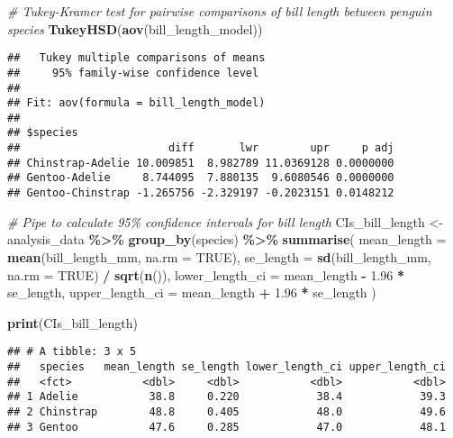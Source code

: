 \documentclass[
]{article}
\newenvironment{Shaded}{\begin{snugshade}}{\end{snugshade}}
\newcommand{\AttributeTok}[1]{\textcolor[rgb]{0.13,0.29,0.53}{#1}}
\newcommand{\CommentTok}[1]{\textcolor[rgb]{0.56,0.35,0.01}{\textit{#1}}}
\newcommand{\ConstantTok}[1]{\textcolor[rgb]{0.56,0.35,0.01}{#1}}
\newcommand{\FloatTok}[1]{\textcolor[rgb]{0.00,0.00,0.81}{#1}}
\newcommand{\FunctionTok}[1]{\textcolor[rgb]{0.13,0.29,0.53}{\textbf{#1}}}
\newcommand{\NormalTok}[1]{#1}
\newcommand{\OtherTok}[1]{\textcolor[rgb]{0.56,0.35,0.01}{#1}}
\newcommand{\SpecialCharTok}[1]{\textcolor[rgb]{0.81,0.36,0.00}{\textbf{#1}}}
\begin{document}
\begin{Shaded}
\begin{Highlighting}[]
\CommentTok{\# Tukey{-}Kramer test for pairwise comparisons of bill length between penguin species}
\FunctionTok{TukeyHSD}\NormalTok{(}\FunctionTok{aov}\NormalTok{(bill\_length\_model))}
\end{Highlighting}
\end{Shaded}

\begin{verbatim}
##   Tukey multiple comparisons of means
##     95% family-wise confidence level
## 
## Fit: aov(formula = bill_length_model)
## 
## $species
##                       diff       lwr        upr     p adj
## Chinstrap-Adelie 10.009851  8.982789 11.0369128 0.0000000
## Gentoo-Adelie     8.744095  7.880135  9.6080546 0.0000000
## Gentoo-Chinstrap -1.265756 -2.329197 -0.2023151 0.0148212
\end{verbatim}

\begin{Shaded}
\begin{Highlighting}[]
\CommentTok{\# Pipe to calculate 95\% confidence intervals for bill length}
\NormalTok{CIs\_bill\_length }\OtherTok{\textless{}{-}}\NormalTok{ analysis\_data }\SpecialCharTok{\%\textgreater{}\%}
  \FunctionTok{group\_by}\NormalTok{(species) }\SpecialCharTok{\%\textgreater{}\%}
  \FunctionTok{summarise}\NormalTok{(}
    \AttributeTok{mean\_length =} \FunctionTok{mean}\NormalTok{(bill\_length\_mm, }\AttributeTok{na.rm =} \ConstantTok{TRUE}\NormalTok{),}
    \AttributeTok{se\_length =} \FunctionTok{sd}\NormalTok{(bill\_length\_mm, }\AttributeTok{na.rm =} \ConstantTok{TRUE}\NormalTok{) }\SpecialCharTok{/} \FunctionTok{sqrt}\NormalTok{(}\FunctionTok{n}\NormalTok{()),}
    \AttributeTok{lower\_length\_ci =}\NormalTok{ mean\_length }\SpecialCharTok{{-}} \FloatTok{1.96} \SpecialCharTok{*}\NormalTok{ se\_length,}
    \AttributeTok{upper\_length\_ci =}\NormalTok{ mean\_length }\SpecialCharTok{+} \FloatTok{1.96} \SpecialCharTok{*}\NormalTok{ se\_length}
\NormalTok{  )}

\FunctionTok{print}\NormalTok{(CIs\_bill\_length)}
\end{Highlighting}
\end{Shaded}

\begin{verbatim}
## # A tibble: 3 x 5
##   species   mean_length se_length lower_length_ci upper_length_ci
##   <fct>           <dbl>     <dbl>           <dbl>           <dbl>
## 1 Adelie           38.8     0.220            38.4            39.3
## 2 Chinstrap        48.8     0.405            48.0            49.6
## 3 Gentoo           47.6     0.285            47.0            48.1
\end{verbatim}
\end{document}
